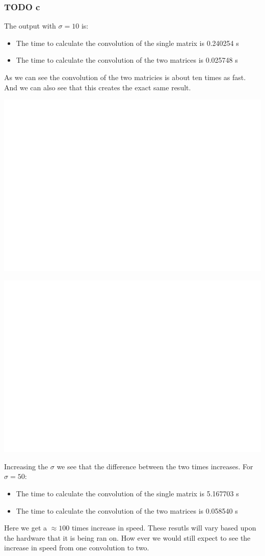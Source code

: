 \documentclass[11pt]{article}
\begin{document}
\subsubsection{{\bfseries\sffamily TODO} c}
\label{sec:orgbd64cfd}
The output with \(\sigma=10\) is:
\begin{itemize}
\item The time to calculate the convolution of the single matrix is 0.240254 s
\item The time to calculate the convolution of the two matrices is 0.025748 s
\end{itemize}
As we can see the convolution of the two matricies is about ten times as fast. And we can also see that this creates the exact same result.
\begin{center}
\includegraphics[width=.9\linewidth]{ENG204-Assignment-3-Single-sigma-10.png}
\end{center}
\begin{center}
\includegraphics[width=.9\linewidth]{ENG204-Assignment-3-Double-sigma-10.png}
\end{center}
Increasing the \(\sigma\) we see that the difference between the two times increases. For \(\sigma=50\):
\begin{itemize}
\item The time to calculate the convolution of the single matrix is 5.167703 s
\item The time to calculate the convolution of the two matrices is 0.058540 s
\end{itemize}
Here we get a \(\approx 100\) times increase in speed. These resutls will vary based upon the hardware that it is being ran on. How ever we would still expect to see the increase in speed from one convolution to two.
\end{document}
